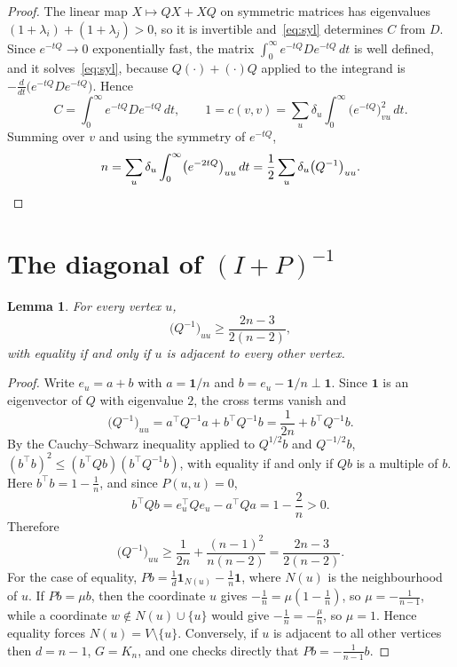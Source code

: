 \documentclass[11pt]{amsart}
\newtheorem{lemma}[theorem]{Lemma}
\theoremstyle{remark}
\numberwithin{equation}{section}
\newcommand{\one}{\mathbf{1}}
\begin{document}
\begin{proof}
The linear map $X\mapsto QX+XQ$ on symmetric matrices has eigenvalues $(1+\lambda_i)+(1+\lambda_j)>0$, so it is
invertible and~\eqref{eq:syl} determines $C$ from $D$. Since $e^{-tQ}\to0$ exponentially fast, the matrix
$\int_0^\infty e^{-tQ}De^{-tQ}\,dt$ is well defined, and it solves~\eqref{eq:syl}, because
$Q(\cdot)+(\cdot)Q$ applied to the integrand is $-\frac{d}{dt}\bigl(e^{-tQ}De^{-tQ}\bigr)$. Hence
\[
C=\int_0^\infty e^{-tQ}De^{-tQ}\,dt,\qquad
1=c(v,v)=\sum_u\delta_u\int_0^\infty\bigl(e^{-tQ}\bigr)_{vu}^2\,dt.
\]
Summing over $v$ and using the symmetry of $e^{-tQ}$,
\[
n=\sum_u\delta_u\int_0^\infty\bigl(e^{-2tQ}\bigr)_{uu}\,dt=\frac12\sum_u\delta_u\bigl(Q^{-1}\bigr)_{uu}.\qedhere
\]
\end{proof}

\section{The diagonal of \texorpdfstring{$(I+P)^{-1}$}{(I+P)\^{}(-1)}}

\begin{lemma}\label{lem:diag}
For every vertex $u$,
\[
\bigl(Q^{-1}\bigr)_{uu}\ge\frac{2n-3}{2(n-2)},
\]
with equality if and only if $u$ is adjacent to every other vertex.
\end{lemma}

\begin{proof}
Write $e_u=a+b$ with $a=\one/n$ and $b=e_u-\one/n\perp\one$. Since $\one$ is an eigenvector of $Q$ with eigenvalue $2$,
the cross terms vanish and
\[
\bigl(Q^{-1}\bigr)_{uu}=a^{\top}Q^{-1}a+b^{\top}Q^{-1}b=\frac1{2n}+b^{\top}Q^{-1}b .
\]
By the Cauchy--Schwarz inequality applied to $Q^{1/2}b$ and $Q^{-1/2}b$,
$(b^{\top}b)^2\le(b^{\top}Qb)(b^{\top}Q^{-1}b)$, with equality if and only if $Qb$ is a multiple of $b$. Here
$b^{\top}b=1-\frac1n$, and since $P(u,u)=0$,
\[
b^{\top}Qb=e_u^{\top}Qe_u-a^{\top}Qa=1-\frac2n>0 .
\]
Therefore
\[
\bigl(Q^{-1}\bigr)_{uu}\ge\frac1{2n}+\frac{(n-1)^2}{n(n-2)}=\frac{2n-3}{2(n-2)} .
\]
For the case of equality, $Pb=\frac1d\one_{N(u)}-\frac1n\one$, where $N(u)$ is the neighbourhood of $u$. If $Pb=\mu b$,
then the coordinate $u$ gives $-\frac1n=\mu(1-\frac1n)$, so $\mu=-\frac1{n-1}$, while a coordinate $w\notin
N(u)\cup\{u\}$ would give $-\frac1n=-\frac{\mu}n$, so $\mu=1$. Hence equality forces $N(u)=V\setminus\{u\}$.
Conversely, if $u$ is adjacent to all other vertices then $d=n-1$, $G=K_n$, and one checks directly that
$Pb=-\frac1{n-1}b$.
\end{proof}
\end{document}
